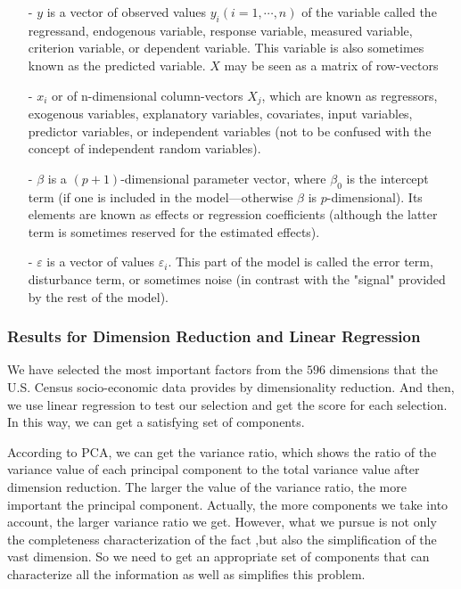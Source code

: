 \documentclass{mcmthesis}
\begin{document}
\begin{itemize}
\item[-] $y$ is a vector of observed values $y_{i} ( i = 1, \cdots, n )$ of the variable called the regressand, endogenous variable, response variable, measured variable, criterion variable, or dependent variable. This variable is also sometimes known as the predicted variable. $X$ may be seen as a matrix of row-vectors 
\item[-] $x_{i}$ or of n-dimensional column-vectors $X_{j}$, which are known as regressors, exogenous variables, explanatory variables, covariates, input variables, predictor variables, or independent variables (not to be confused with the concept of independent random variables).
 \item[-] $\beta$ is a $( p + 1 )$-dimensional parameter vector, where $\beta _{0}$ is the intercept term (if one is included in the model—otherwise $\beta$ is $p$-dimensional). Its elements are known as effects or regression coefficients (although the latter term is sometimes reserved for the estimated effects).
\item[-] $\varepsilon$ is a vector of values $\varepsilon _{i}$. This part of the model is called the error term, disturbance term, or sometimes noise (in contrast with the "signal" provided by the rest of the model).

\end{itemize}

\subsubsection{Results for Dimension Reduction and Linear Regression}

We have selected the most important factors from the $596$ dimensions that the U.S. Census socio-economic data provides by dimensionality reduction. And then, we use linear regression to test our selection and get the score for each selection. In this way, we can get a satisfying set of components. 

According to PCA, we can get the variance ratio, which shows the ratio of the variance value of each principal component to the total variance value after dimension reduction. The larger the value of the variance ratio, the more important the principal component. Actually, the more components we take into account, the larger variance ratio we get. However, what we pursue is not only the completeness characterization of the fact ,but also the simplification of the vast dimension. So we need to get an appropriate set of components that can characterize all the information as well as simplifies this problem.
\end{document}
